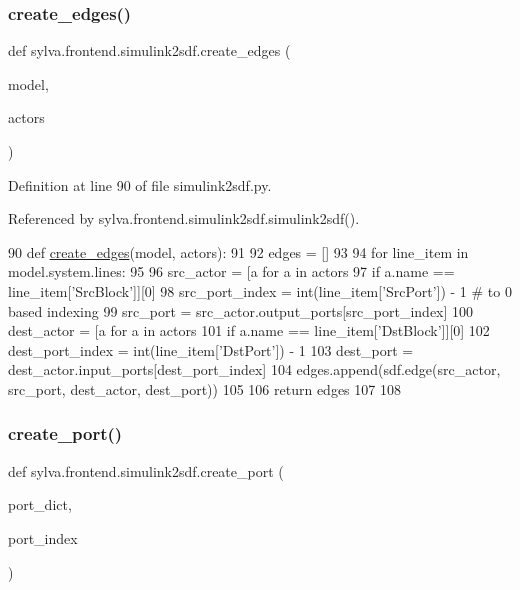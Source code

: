 \subsubsection{\texorpdfstring{create\+\_\+edges()}{create\_edges()}}
{\footnotesize\ttfamily def sylva.\+frontend.\+simulink2sdf.\+create\+\_\+edges (\begin{DoxyParamCaption}\item[{}]{model,  }\item[{}]{actors }\end{DoxyParamCaption})}



Definition at line 90 of file simulink2sdf.\+py.



Referenced by sylva.\+frontend.\+simulink2sdf.\+simulink2sdf().


\begin{DoxyCode}
90 \textcolor{keyword}{def }\hyperlink{namespacesylva_1_1frontend_1_1simulink2sdf_a29bf2b8d871f7bcf95cd79761ad8cd85}{create\_edges}(model, actors):
91 
92     edges = []
93 
94     \textcolor{keywordflow}{for} line\_item \textcolor{keywordflow}{in} model.system.lines:
95 
96         src\_actor = [a \textcolor{keywordflow}{for} a \textcolor{keywordflow}{in} actors
97                      \textcolor{keywordflow}{if} a.name == line\_item[\textcolor{stringliteral}{'SrcBlock'}]][0]
98         src\_port\_index = int(line\_item[\textcolor{stringliteral}{'SrcPort'}]) - 1  \textcolor{comment}{# to 0 based indexing}
99         src\_port = src\_actor.output\_ports[src\_port\_index]
100         dest\_actor = [a \textcolor{keywordflow}{for} a \textcolor{keywordflow}{in} actors
101                       \textcolor{keywordflow}{if} a.name == line\_item[\textcolor{stringliteral}{'DstBlock'}]][0]
102         dest\_port\_index = int(line\_item[\textcolor{stringliteral}{'DstPort'}]) - 1
103         dest\_port = dest\_actor.input\_ports[dest\_port\_index]
104         edges.append(sdf.edge(src\_actor, src\_port, dest\_actor, dest\_port))
105 
106     \textcolor{keywordflow}{return} edges
107 
108 
\end{DoxyCode}
\mbox{\label{namespacesylva_1_1frontend_1_1simulink2sdf_a86a92182288e89b6742e5124e8c3ec38}} 
\subsubsection{\texorpdfstring{create\+\_\+port()}{create\_port()}}
{\footnotesize\ttfamily def sylva.\+frontend.\+simulink2sdf.\+create\+\_\+port (\begin{DoxyParamCaption}\item[{}]{port\+\_\+dict,  }\item[{}]{port\+\_\+index }\end{DoxyParamCaption})}



